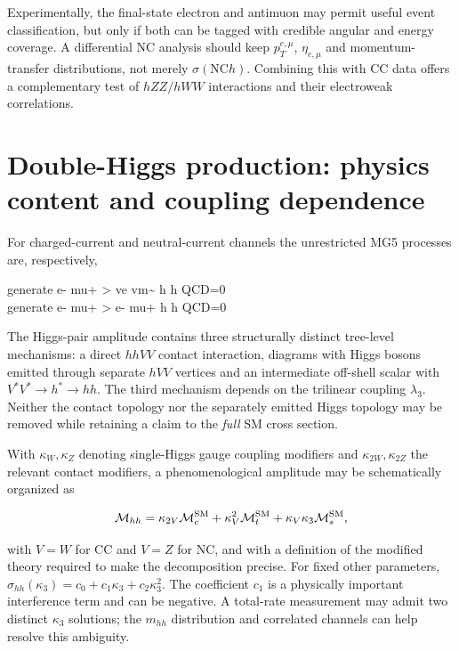 \documentclass[12pt,a4paper]{article}
\newcommand{\newnote}{\clearpage}
\newcommand{\NC}{\mathrm{NC}}
\begin{document}
Experimentally, the final-state electron and antimuon may permit useful event classification, but only if both can be tagged with credible angular and energy coverage. A differential NC analysis should keep $p_T^{e,\mu}$, $\eta_{e,\mu}$ and momentum-transfer distributions, not merely $\sigma(\NC h)$. Combining this with CC data offers a complementary test of $hZZ/hWW$ interactions and their electroweak correlations.




\newnote

\section{Double-Higgs production: physics content and coupling dependence}

For charged-current and neutral-current channels the unrestricted MG5 processes are, respectively,

\begin{center}
\ttfamily\small
 generate e- mu+ > ve vm\textasciitilde{} h h QCD=0\\
 generate e- mu+ > e- mu+ h h QCD=0
\end{center}


The Higgs-pair amplitude contains three structurally distinct tree-level mechanisms: a direct $hhVV$ contact interaction, diagrams with Higgs bosons emitted through separate $hVV$ vertices and an intermediate off-shell scalar with $V^*V^*\to h^*\to hh$. The third mechanism depends on the trilinear coupling $\lambda_3$. Neither the contact topology nor the separately emitted Higgs topology may be removed while retaining a claim to the \emph{full} SM cross section.

With $\kappa_W,\kappa_Z$ denoting single-Higgs gauge coupling modifiers and $\kappa_{2W},\kappa_{2Z}$ the relevant contact modifiers, a phenomenological amplitude may be schematically organized as

\begin{equation}\label{eq:hhamp}
\mathcal M_{hh}=\kappa_{2V}\mathcal M_c^{\rm SM}
+\kappa_V^2\mathcal M_t^{\rm SM}
+\kappa_V\kappa_3\mathcal M_s^{\rm SM},
\end{equation}

with $V=W$ for CC and $V=Z$ for NC, and with a definition of the modified theory required to make the decomposition precise. For fixed other parameters, $\sigma_{hh}(\kappa_3)=c_0+c_1\kappa_3+c_2\kappa_3^2$. The coefficient $c_1$ is a physically important interference term and can be negative. A total-rate measurement may admit two distinct $\kappa_3$ solutions; the $m_{hh}$ distribution and correlated channels can help resolve this ambiguity.
\end{document}
